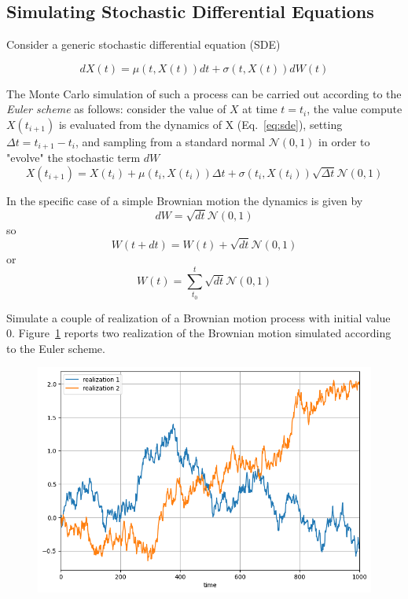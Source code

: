 \documentclass[12pt,a4paper]{article}
\begin{document}
\subsection{Simulating Stochastic Differential Equations}

Consider a generic stochastic differential equation (SDE)

\begin{equation}
dX(t) = \mu(t,X(t))dt + \sigma(t,X(t))dW(t)
\label{eq:sde}
\end{equation}

The Monte Carlo simulation of such a process can be carried out according to the \emph{Euler scheme} as follows: consider the value of $X$ at time $t=t_i$, the value compute $X(t_{i+1})$ is evaluated from the dynamics of X (Eq.~\ref{eq:sde}), setting $\Delta t = t_{i+1} - t_{i}$, and sampling from a standard normal $\mathcal{N}(0,1)$ in order to "evolve" the stochastic term $dW$
\begin{equation}
X(t_{i+1}) = X(t_i) + \mu(t_i,X(t_i))\Delta t + \sigma(t_i,X(t_i))\sqrt{\Delta t}\mathcal{N}(0,1)
\end{equation}

In the specific case of a simple Brownian motion the dynamics is given by
\begin{equation}
dW = \sqrt{dt}\mathcal{N}(0,1)
\end{equation}
so
\begin{equation}
W(t+dt) = W(t) + \sqrt{dt}\mathcal{N}(0,1)
\end{equation}
or
\begin{equation}
W(t) = \sum_{t_0}^{t} \sqrt{dt}\mathcal{N}(0,1)
\end{equation}

\begin{question}
Simulate a couple of realization of a Brownian motion process with initial value 0.
Figure~\ref{fig:brownian_motion} reports two realization of the Brownian motion simulated according to the Euler scheme.

\begin{figure}[htbp]
\begin{center}
\includegraphics[width=0.5\linewidth]{addons/brownian_motion}
\end{center}
\label{fig:brownian_motion}
\end{figure}
\end{question}
\end{document}
